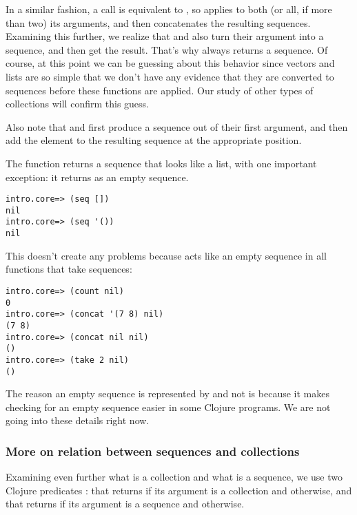 In a similar fashion, a call  is equivalent to , so  applies  to both (or all, if more than two) its arguments, and then concatenates the resulting sequences. Examining this further, we realize that  and  also turn their argument into a sequence, and then get the result. That's why  always returns a sequence. Of course, at this point we can be guessing about this behavior since vectors and lists are so simple that we don't have any evidence that they are converted to sequences before these functions are applied. Our study of other types of collections will confirm this guess. 

Also note that  and  first produce a sequence out of their first argument, and then add the element to the resulting sequence at the appropriate position. 

The  function returns a sequence that looks like a list, with one important exception: it returns  as an empty sequence.
\begin{framed}
\begin{verbatim}
intro.core=> (seq [])
nil
intro.core=> (seq '())
nil
\end{verbatim}
\end{framed} 
This doesn't create any problems because  acts like an empty sequence in all functions that take sequences:
\begin{framed}
\begin{verbatim}
intro.core=> (count nil)
0
intro.core=> (concat '(7 8) nil)
(7 8)
intro.core=> (concat nil nil)
()
intro.core=> (take 2 nil)
()
\end{verbatim}
\end{framed} 
The reason an empty sequence is represented by  and not  is because it makes checking for an empty sequence easier in some Clojure programs. We are not going into these details right now. 

\subsubsection{More on relation between sequences and collections}\label{subsub:seq-coll-convert}
Examining even further what is a collection and what is a sequence, we use two Clojure predicates :  that returns  if its argument is a collection and  otherwise, and  that returns  if its argument is a sequence and  otherwise. 

